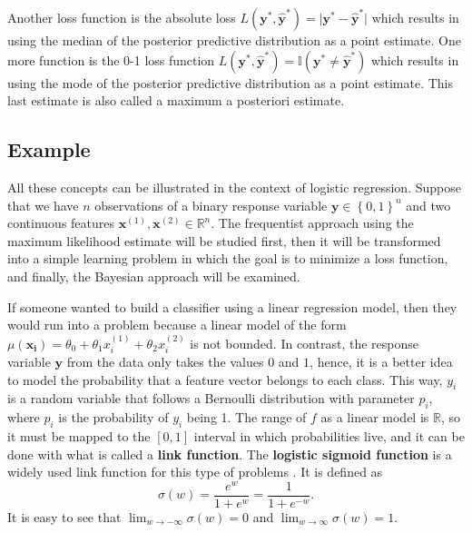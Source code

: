 Another loss function is the absolute loss $L(\boldsymbol{y}^*, \hat{\boldsymbol{y}}^*) = \vert \boldsymbol{y}^* - \hat{\boldsymbol{y}}^* \vert$ which results in using the median of the posterior predictive distribution as a point estimate. One more function is the 0-1 loss function $L(\boldsymbol{y}^*, \hat{\boldsymbol{y}}^*) = \mathbb{I}(\boldsymbol{y}^* \neq \hat{\boldsymbol{y}}^* )$ which results in using the mode of the posterior predictive distribution as a point estimate. This last estimate is also called a maximum a posteriori estimate.

\subsection{Example}

All these concepts can be illustrated in the context of logistic regression. Suppose that we have $n$ observations of a binary response variable $\boldsymbol{y} \in \left\{0, 1\right\}^n$ and two continuous features $\boldsymbol{x}^{(1)}, \boldsymbol{x}^{(2)} \in \mathbb{R}^n$. The frequentist approach using the maximum likelihood estimate will be studied first, then it will be transformed into a simple learning problem in which the goal is to minimize a loss function, and finally, the Bayesian approach will be examined.

If someone wanted to build a classifier using a linear regression model, then they would run into a problem because a linear model of the form $\mu(\boldsymbol{x_i}) = \theta_0 + \theta_1 x_i^{(1)} + \theta_2 x_i^{(2)}$ is not bounded. In contrast, the response variable $\boldsymbol{y}$ from the data only takes the values $0$ and $1$, hence, it is a better idea to model the probability that a feature vector belongs to each class. This way, $y_i$ is a random variable that follows a Bernoulli distribution with parameter $p_i$, where $p_i$ is the probability of $y_i$ being 1.
The range of $f$ as a linear model is $\mathbb{R}$, so it must be mapped to the $\left[ 0,1 \right]$ interval in which probabilities live, and it can be done with what is called a \textbf{link function}. The \textbf{logistic sigmoid function} %
is a widely used link function for this type of problems \cite[p.~114]{christopher2006pattern}. It is defined as
\begin{equation}
  \sigma(w) = \frac{e^w}{1 + e^w} = \frac{1}{1 + e^{-w}}.
\end{equation}
It is easy to see that $\lim_{w \to -\infty} \sigma(w) = 0$ and $\lim_{w \to \infty} \sigma(w) = 1$.

